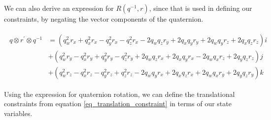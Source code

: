 \documentclass{article}
\begin{document}
We can also derive an expression for $R(q^{-1}, r)$, since that is used in defining our constraints, by negating the vector components of the quaternion.

\begin{align}
    \begin{split}
        q \otimes r^\prime \otimes q^{-1} &= (q_w^2r_x + q_x^2r_x - q_y^2r_x - q_z^2r_x - 2q_wq_zr_y + 2q_xq_yr_y + 2q_wq_yr_z + 2q_xq_zr_z)i \\
                                          &+ (q_w^2r_y - q_x^2r_y + q_y^2r_y - q_z^2r_y + 2q_wq_zr_x + 2q_xq_yr_x - 2q_wq_xr_z + 2q_yq_zr_z)j \\
                                          &+ (q_w^2r_z - q_x^2r_z - q_y^2r_z + q_z^2r_z - 2q_wq_yr_x + 2q_xq_zr_x + 2q_wq_xr_y + 2q_yq_zr_y)k
    \end{split}
\end{align}

Using the expression for quaternion rotation, we can define the translational constraints from equation \eqref{eq_translation_constraint} in terms of our state variables.
\end{document}

